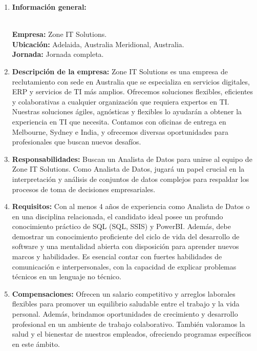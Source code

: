 \documentclass[12pt]{article}
\begin{document}
                \begin{enumerate}
                    \item \textbf{Información general:}
                    
                        \textbf{\\Empresa:} Zone IT Solutions.
                        \textbf{\\Ubicación:} Adelaida, Australia Meridional, Australia.
                        \textbf{\\Jornada:} Jornada completa.

                    \item \textbf{Descripción de la empresa:}
                        Zone IT Solutions es una empresa de reclutamiento con sede en Australia que se especializa en servicios digitales, ERP y servicios de TI más amplios. Ofrecemos soluciones flexibles, eficientes y colaborativas a cualquier organización que requiera expertos en TI. Nuestras soluciones ágiles, agnósticas y flexibles lo ayudarán a obtener la experiencia en TI que necesita. Contamos con oficinas de entrega en Melbourne, Sydney e India, y ofrecemos diversas oportunidades para profesionales que buscan nuevos desafíos.

                    \item \textbf{Responsabilidades:}
                        Buscan un Analista de Datos para unirse al equipo de Zone IT Solutions. Como Analista de Datos, jugará un papel crucial en la interpretación y análisis de conjuntos de datos complejos para respaldar los procesos de toma de decisiones empresariales.

                    \item \textbf{Requisitos:}
                        Con al menos 4 años de experiencia como Analista de Datos o en una disciplina relacionada, el candidato ideal posee un profundo conocimiento práctico de SQL (SQL, SSIS) y PowerBI. Además, debe demostrar un conocimiento proficiente del ciclo de vida del desarrollo de software y una mentalidad abierta con disposición para aprender nuevos marcos y habilidades. Es esencial contar con fuertes habilidades de comunicación e interpersonales, con la capacidad de explicar problemas técnicos en un lenguaje no técnico.

                    \item \textbf{Compensaciones:}
                        Ofrecen un salario competitivo y arreglos laborales flexibles para promover un equilibrio saludable entre el trabajo y la vida personal. Además, brindamos oportunidades de crecimiento y desarrollo profesional en un ambiente de trabajo colaborativo. También valoramos la salud y el bienestar de nuestros empleados, ofreciendo programas específicos en este ámbito.

                \end{enumerate}
            
\end{document}
